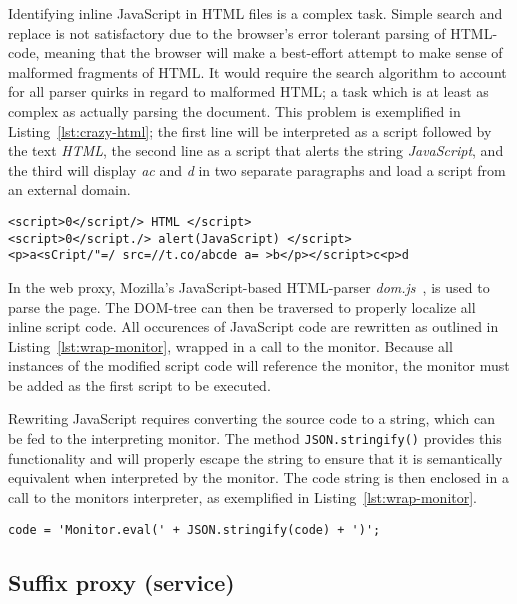 \documentclass{llncs}
\begin{document}
Identifying inline JavaScript in HTML files is a complex task. 
Simple search and replace is not satisfactory due to the browser's error tolerant parsing of HTML-code, meaning that the 
browser will make a best-effort attempt to make sense of malformed fragments of 
HTML. It would require the search 
algorithm to account for all parser quirks in regard to malformed HTML;
a task which is at least as complex as actually parsing the document.
This problem is exemplified in Listing~\ref{lst:crazy-html}; the first line
will be interpreted as a script followed by the text \emph{HTML}, the second
line as a script that alerts the string \emph{JavaScript}, and the third will 
display \emph{ac} and \emph{d} in two separate paragraphs and load a script
from an external domain.

\begin{lstlisting}[language=langsmall,label=lst:crazy-html, caption=Example of complicated HTML]
<script>0</script/> HTML </script>
<script>0</script./> alert(JavaScript) </script>
<p>a<sCript/"=/ src=//t.co/abcde a= >b</p></script>c<p>d
\end{lstlisting}


In the web proxy, Mozilla's JavaScript-based HTML-parser \emph{dom.js}~\cite{Mozilla:dom.js}, is used 
to parse the page. The DOM-tree can then be traversed to properly localize 
all inline script code. All occurences of JavaScript code are rewritten as 
outlined in Listing~\ref{lst:wrap-monitor}, wrapped in a call to the monitor.
Because all instances of the modified script code will reference the monitor, 
the monitor must be added as the first script to be executed.


Rewriting JavaScript requires converting the source code to a string, which can 
be fed to the interpreting monitor. The method \lstinline{JSON.stringify()} 
provides this functionality and will properly escape the string to ensure that 
it is semantically equivalent when interpreted by the monitor. The code string is then enclosed in a call to the monitors 
interpreter, as exemplified in Listing~\ref{lst:wrap-monitor}.

\begin{lstlisting}[language=langsmall,label=lst:wrap-monitor, caption=Example of monitor wrapping]
code = 'Monitor.eval(' + JSON.stringify(code) + ')';
\end{lstlisting}




\subsection{Suffix proxy (service)}
\end{document}
